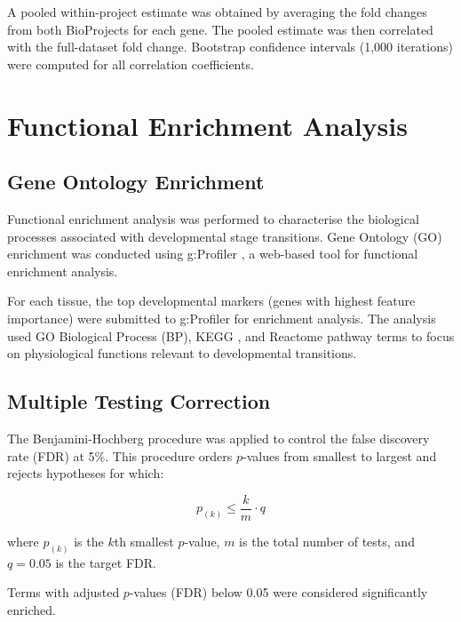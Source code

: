 A pooled within-project estimate was obtained by averaging the fold changes from both BioProjects for each gene. The pooled estimate was then correlated with the full-dataset fold change. Bootstrap confidence intervals (1,000 iterations) were computed for all correlation coefficients.


\section{Functional Enrichment Analysis}\label{sec:methods:enrichment}

\subsection{Gene Ontology Enrichment}

Functional enrichment analysis was performed to characterise the biological processes associated with developmental stage transitions. Gene Ontology (GO) \parencite{ashburner_gene_2000} enrichment was conducted using g:Profiler \parencite{kolberg_gprofiler-interoperable_2023}, a web-based tool for functional enrichment analysis.

For each tissue, the top developmental markers (genes with highest feature importance) were submitted to g:Profiler for enrichment analysis. The analysis used GO Biological Process (BP), KEGG \parencite{kanehisa_kegg_2000}, and Reactome \parencite{gillespie_reactome_2022} pathway terms to focus on physiological functions relevant to developmental transitions.

\subsection{Multiple Testing Correction}

The Benjamini-Hochberg procedure \parencite{benjamini_controlling_1995} was applied to control the false discovery rate (FDR) at 5\%. This procedure orders $p$-values from smallest to largest and rejects hypotheses for which:

\begin{equation}
    p_{(k)} \leq \frac{k}{m} \cdot q
    \label{eq:bh}
\end{equation}

where $p_{(k)}$ is the $k$th smallest $p$-value, $m$ is the total number of tests, and $q = 0.05$ is the target FDR.

Terms with adjusted $p$-values (FDR) below 0.05 were considered significantly enriched.



